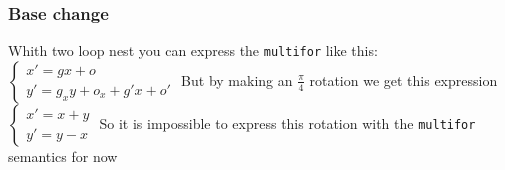 \documentclass{beamer}
\begin{document}
\begin{frame}
\frametitle{Base change}

Whith two loop nest you can express the \texttt{multifor} like this:
\newline{} \newline{}
\begin{math}
\begin{cases}
x'=gx+o \\
y'=g_x y + o_x + g'x+o'
\end{cases}
\end{math} \newline \newline
But by making an \begin{math}\frac{\pi}{4}\end{math} rotation we get this expression \newline \newline
\begin{math}
\begin{cases}
x'= x+y \\
y'=y-x
\end{cases}
\end{math}\newline \newline 
So it is impossible to express this rotation with the \texttt{multifor} semantics for now

\end{frame}

\end{document}
